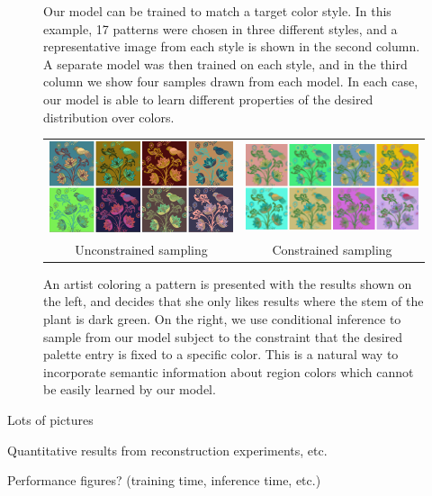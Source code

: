 \begin{figure}[ht]
\caption{Our model can be trained to match a target color style. In this example, 17 patterns were chosen in three different styles, and a representative image from each style is shown in the second column. A separate model was then trained on each style, and in the third column we show four samples drawn from each model. In each case, our model is able to learn different properties of the desired distribution over colors.}
\label{fig:styleTraining}
\vspace{-1.0em}
\end{figure}

\begin{figure}[ht]
\begin{tabular}{cc} 
\includegraphics[width=.475\linewidth]{figs/constrainedSearchUnconstrained}&\includegraphics[width=.475\linewidth]{figs/constrainedSearchConstrained}\\
Unconstrained sampling&Constrained sampling\\
\end{tabular}

\caption{An artist coloring a pattern is presented with the results shown on the left, and decides that she only likes results where the stem of the plant is dark green. On the right, we use conditional inference to sample from our model subject to the constraint that the desired palette entry is fixed to a specific color. This is a natural way to incorporate semantic information about region colors which cannot be easily learned by our model.}
\label{fig:constrainedInference}
\vspace{-1.0em}
\end{figure}

Lots of pictures

Quantitative results from reconstruction experiments, etc.

Performance figures? (training time, inference time, etc.)